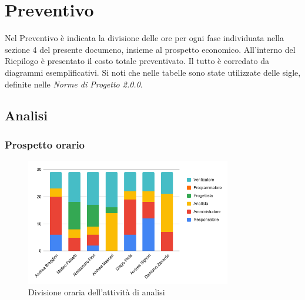 \section{Preventivo}
Nel Preventivo è indicata la divisione delle ore per ogni fase individuata nella sezione 4 del presente documeno, insieme al prospetto economico. All'interno del Riepilogo è presentato il costo totale preventivato. Il tutto è corredato da diagrammi esemplificativi.
Si noti che nelle tabelle sono state utilizzate delle sigle, definite nelle \textit{Norme di Progetto 2.0.0}. %
\subsection{Analisi}

    \subsubsection{Prospetto orario}
    \def\hourlycontent{
        {Andrea Breggion,6,14,3,0,0,6,29},
        {Matteo Falsetti,0,5,3,10,0,11,29},
        {Alessandro Flori,2,4,3,8,0,12,29},
        {Andrea Mascari,0,0,14,2,0,13,29},
        {Diego Piola,6,13,3,0,0,7,29},
        {Andrea Signori,12,6,4,0,0,7,29},
        {Damiano Zanardo,0,7,14,0,0,8,29},
        {Ore totali, 25, 51, 44, 19, 0, 64, 203},
    }
    
    \begin{figure}[H]
        \centering
        \includegraphics[width=0.8\textwidth]{source/img/analisi_orari.png}
        \caption{Divisione oraria dell'attività di analisi}
    \end{figure}
